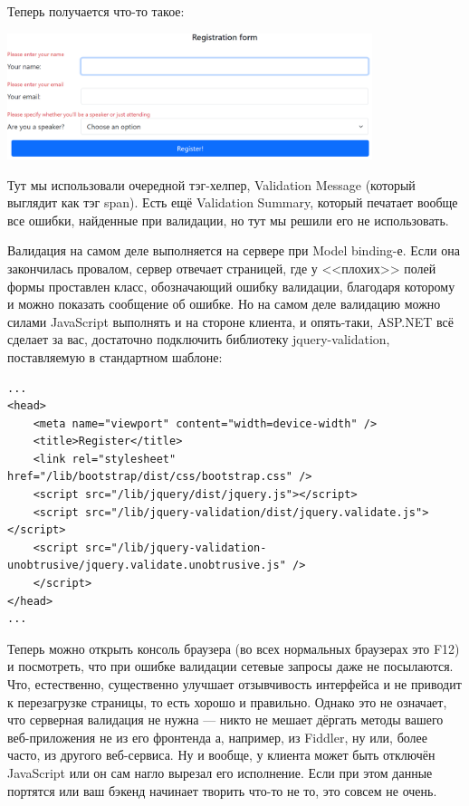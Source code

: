 \documentclass[a5paper]{article}
\begin{document}
Теперь получается что-то такое:

\begin{center}
    \includegraphics[width=0.8\textwidth]{validationError.png}
\end{center}

Тут мы использовали очередной тэг-хелпер, Validation Message (который выглядит как тэг span). Есть ещё Validation Summary, который печатает вообще все ошибки, найденные при валидации, но тут мы решили его не использовать.

Валидация на самом деле выполняется на сервере при Model binding-е. Если она закончилась провалом, сервер отвечает страницей, где у <<плохих>> полей формы проставлен класс, обозначающий ошибку валидации, благодаря которому и можно показать сообщение об ошибке. Но на самом деле валидацию можно силами JavaScript выполнять и на стороне клиента, и опять-таки, ASP.NET всё сделает за вас, достаточно подключить библиотеку jquery-validation, поставляемую в стандартном шаблоне:

\begin{verbatim}
...
<head>
    <meta name="viewport" content="width=device-width" />
    <title>Register</title>
    <link rel="stylesheet" href="/lib/bootstrap/dist/css/bootstrap.css" />
    <script src="/lib/jquery/dist/jquery.js"></script>
    <script src="/lib/jquery-validation/dist/jquery.validate.js"></script>
    <script src="/lib/jquery-validation-unobtrusive/jquery.validate.unobtrusive.js" />
    </script>
</head>
...
\end{verbatim}

Теперь можно открыть консоль браузера (во всех нормальных браузерах это F12) и посмотреть, что при ошибке валидации сетевые запросы даже не посылаются. Что, естественно, существенно улучшает отзывчивость интерфейса и не приводит к перезагрузке страницы, то есть хорошо и правильно. Однако это не означает, что серверная валидация не нужна --- никто не мешает дёргать методы вашего веб-приложения не из его фронтенда а, например, из Fiddler, ну или, более часто, из другого веб-сервиса. Ну и вообще, у клиента может быть отключён JavaScript или он сам нагло вырезал его исполнение. Если при этом данные портятся или ваш бэкенд начинает творить что-то не то, это совсем не очень.
\end{document}
